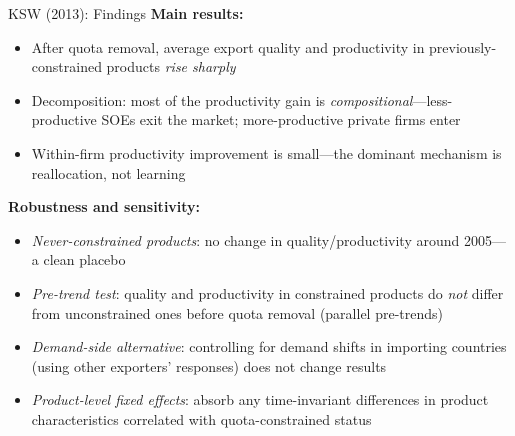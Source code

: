 \documentclass{beamer}
\begin{document}
\begin{frame}{KSW (2013): Findings}
\textbf{Main results:}
\begin{itemize}
  \item After quota removal, average export quality and productivity in
        previously-constrained products \emph{rise sharply}
  \item Decomposition: most of the productivity gain is
        \emph{compositional}---less-productive SOEs exit the market;
        more-productive private firms enter
  \item Within-firm productivity improvement is small---the dominant
        mechanism is reallocation, not learning
\end{itemize}

\medskip
\textbf{Robustness and sensitivity:}
\begin{itemize}
  \item \emph{Never-constrained products}: no change in quality/productivity
        around 2005---a clean placebo
  \item \emph{Pre-trend test}: quality and productivity in constrained
        products do \emph{not} differ from unconstrained ones before
        quota removal (parallel pre-trends)
  \item \emph{Demand-side alternative}: controlling for demand shifts in
        importing countries (using other exporters' responses) does not
        change results
  \item \emph{Product-level fixed effects}: absorb any time-invariant
        differences in product characteristics correlated with
        quota-constrained status
\end{itemize}
\end{frame}
\end{document}
